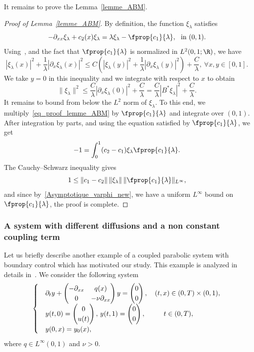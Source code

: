 It remains to prove the Lemma~\ref{lemme_ABM}.
\begin{proof}[Proof of Lemma~\ref{lemme_ABM}]
By definition, the function $\xi_\lambda$ satisfies
\begin{equation}\label{eq_proof_lemme_ABM}
-\partial_{xx}\xi_\lambda + c_2(x) \xi_\lambda = \lambda \xi_\lambda - \fprop{c_1}{\lambda}, \ \ \text{in $(0,1)$}.
\end{equation}
Using~\cite[Lemmas~2.2 and 2.3]{ABM_2018}, and the fact that $\fprop{c_1}{\lambda}$ is normalized in $L^2(0,1;\R)$, we have
\[
|\xi_\lambda(x)|^2 + \frac{1}{\lambda} |\partial_x \xi_\lambda(x)|^2 \leq C \left(|\xi_\lambda(y)|^2 + \frac{1}{\lambda} |\partial_x \xi_\lambda(y)|^2\right) + \frac{C}{\lambda}, \ \forall x,y\in [0,1].
\]
We take $y=0$ in this inequality and we integrate with respect to $x$ to obtain
\[
\|\xi_\lambda\|^2 \leq \frac{C}{\lambda} |\partial_x \xi_\lambda(0)|^2 + \frac{C}{\lambda} = \frac{C}{\lambda} |B^*\xi_\lambda|^2 + \frac{C}{\lambda}.
\]
It remains to bound from below the $L^2$ norm of $\xi_\lambda$. To this end, we multiply~\eqref{eq_proof_lemme_ABM} by $\fprop{c_1}{\lambda}$ and integrate over $(0,1)$. After integration by parts, and using the equation satisfied by $\fprop{c_1}{\lambda}$, we get
\[
-1 = \int_0^1 (c_2-c_1) \xi_\lambda \fprop{c_1}{\lambda}.
\]
The Cauchy--Schwarz inequality gives
\[
1\leq \|c_1-c_2\|\,\|\xi_\lambda\|\,\|\fprop{c_1}{\lambda}\|_{L^\infty},
\]
and since by~\eqref{Asymptotique_varphi_new}, we have a uniform $L^\infty$ bound on $\fprop{c_1}{\lambda}$, the proof is complete.
\end{proof}

\subsubsection{A system with different diffusions and a non constant coupling term}

Let us briefly describe another example of a coupled parabolic system with boundary control which has motivated our study. This example is analyzed in details in~\cite{Samb18}. We consider the following system
\begin{equation}\label{systeme_elhadji}
\begin{cases}
& \partial_t y +
\begin{pmatrix} - \partial_{xx} & q(x) \\ 0 & - \nu \partial_{xx}
\end{pmatrix} y =
\begin{pmatrix} 0 \\ 0
\end{pmatrix},
\quad (t,x) \in (0,T) \times (0,1),
\\
&y(t,0) =
\begin{pmatrix} 0 \\ u(t)
\end{pmatrix},\, y(t,1) =
\begin{pmatrix} 0 \\ 0
\end{pmatrix}, \mkern 48mu t\in (0,T),
\\[0.15em]
&y(0,x) = y_0(x),
\end{cases}
\end{equation}
where $q\in L^\infty(0,1)$ and $\nu>0$.

